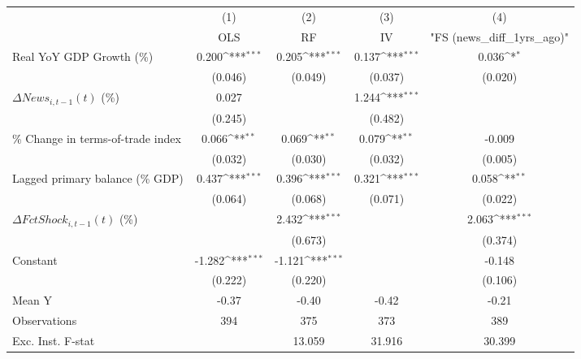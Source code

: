 {
\def\sym#1{\ifmmode^{#1}\else\(^{#1}\)\fi}
\begin{tabular}{l*{4}{c}}
\toprule
                    &\multicolumn{1}{c}{(1)}&\multicolumn{1}{c}{(2)}&\multicolumn{1}{c}{(3)}&\multicolumn{1}{c}{(4)}\\
                    &\multicolumn{1}{c}{OLS}&\multicolumn{1}{c}{RF}&\multicolumn{1}{c}{IV}&\multicolumn{1}{c}{ "FS (news_diff_1yrs_ago)" }\\
\midrule
Real YoY GDP Growth (\%)&       0.200\sym{***}&       0.205\sym{***}&       0.137\sym{***}&       0.036\sym{*}  \\
                    &     (0.046)         &     (0.049)         &     (0.037)         &     (0.020)         \\
\addlinespace
$ \Delta News_{i,t-1}(t)$ (\%)&       0.027         &                     &       1.244\sym{***}&                     \\
                    &     (0.245)         &                     &     (0.482)         &                     \\
\addlinespace
\% Change in terms-of-trade index&       0.066\sym{**} &       0.069\sym{**} &       0.079\sym{**} &      -0.009         \\
                    &     (0.032)         &     (0.030)         &     (0.032)         &     (0.005)         \\
\addlinespace
Lagged primary balance (\% GDP)&       0.437\sym{***}&       0.396\sym{***}&       0.321\sym{***}&       0.058\sym{**} \\
                    &     (0.064)         &     (0.068)         &     (0.071)         &     (0.022)         \\
\addlinespace
$ \Delta FctShock_{i,t-1}(t)$ (\%)&                     &       2.432\sym{***}&                     &       2.063\sym{***}\\
                    &                     &     (0.673)         &                     &     (0.374)         \\
\addlinespace
Constant            &      -1.282\sym{***}&      -1.121\sym{***}&                     &      -0.148         \\
                    &     (0.222)         &     (0.220)         &                     &     (0.106)         \\
\midrule
Mean Y              &       -0.37         &       -0.40         &       -0.42         &       -0.21         \\
Observations        &         394         &         375         &         373         &         389         \\
Exc. Inst. F-stat   &                     &      13.059         &      31.916         &      30.399         \\
\bottomrule
\end{tabular}
}
